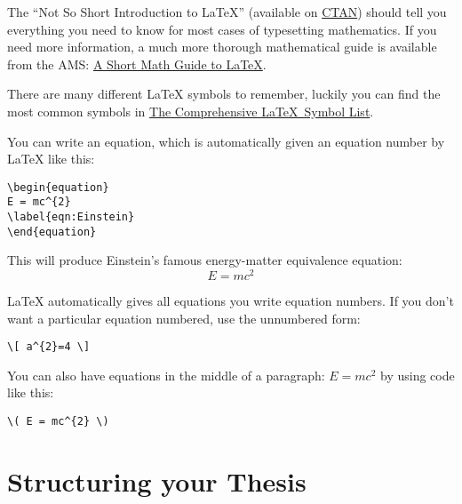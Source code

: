 The \enquote{Not So Short Introduction to LaTeX} (available on \href{http://www.ctan.org/tex-archive/info/lshort/english/lshort.pdf}{CTAN}) should tell you everything you need to know for most cases of typesetting mathematics. If you need more information, a much more thorough mathematical guide is available from the AMS: \href{{ftp://ftp.ams.org/pub/tex/doc/amsmath/short-math-guide.pdf}}{A Short Math Guide to LaTeX}.

There are many different LaTeX symbols to remember, luckily you can find the most common symbols in \href{http://ctan.org/pkg/comprehensive}{The Comprehensive \LaTeX~Symbol List}.

You can write an equation, which is automatically given an equation number by LaTeX like this:
\begin{lstlisting}[language={[LaTeX]TeX}]
\begin{equation}
E = mc^{2}
\label{eqn:Einstein}
\end{equation}
\end{lstlisting}

This will produce Einstein's famous energy-matter equivalence equation:
\begin{equation}
E = mc^{2}
\label{eqn:Einstein}
\end{equation}

LaTeX automatically gives all equations you write equation numbers. If you don't want a particular equation numbered, use the unnumbered form:

\begin{lstlisting}[language={[LaTeX]TeX}]
\[ a^{2}=4 \]
\end{lstlisting}

You can also have equations in the middle of a paragraph: \( E = mc^{2} \) by using code like this: 

\begin{lstlisting}[language={[LaTeX]TeX}]
\( E = mc^{2} \)
\end{lstlisting}


\section{Structuring your Thesis}


